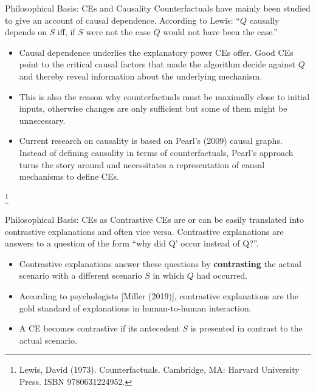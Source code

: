 \documentclass[11pt,compress,t,notes=noshow, xcolor=table]{beamer}
\begin{document}
\begin{vbframe}{Philosophical Basis: CEs and Causality}
Counterfactuals have mainly been studied to give an account of causal dependence. According to Lewis:\newline
``$Q$ causally depends on $S$ iff, if $S$ were not the case $Q$ would not have been the case.''
	\begin{itemize}
		\item Causal dependence underlies the explanatory power CEs offer. Good CEs point to the critical causal factors that made the algorithm decide against $Q$ and thereby reveal information about the underlying mechanism.
		\item This is also the reason why counterfactuals must be maximally close to initial inputs, otherwise changes are only sufficient but some of them might be unnecessary.
		\item Current research on causality is based on Pearl's (2009) causal graphs. Instead of defining causality in terms of counterfactuals, Pearl's approach turns the story around and necessitates a representation of causal mechanisms to define CEs. 
	\end{itemize}
\footnote[frame]{Lewis, David (1973). Counterfactuals. Cambridge, MA: Harvard University Press. ISBN 9780631224952. }
\end{vbframe}

\begin{vbframe}{Philosophical Basis: CEs as Contrastive}
CEs are or can be easily translated into contrastive explanations and often vice versa. Contrastive explanations are answers to a question of the form ``why did Q' occur instead of Q?''.
	\begin{itemize}
	    \item  Contrastive explanations answer these questions by \textbf{contrasting} the actual scenario with a different scenario $S$ in which $Q$ had occurred.
		\item According to psychologists [Miller (2019)], contrastive explanations are the gold standard of explanations in human-to-human interaction.
		\item A CE becomes contrastive if its antecedent $S$ is presented in contrast to the actual scenario.
	\end{itemize}
\end{vbframe}
\end{document}
